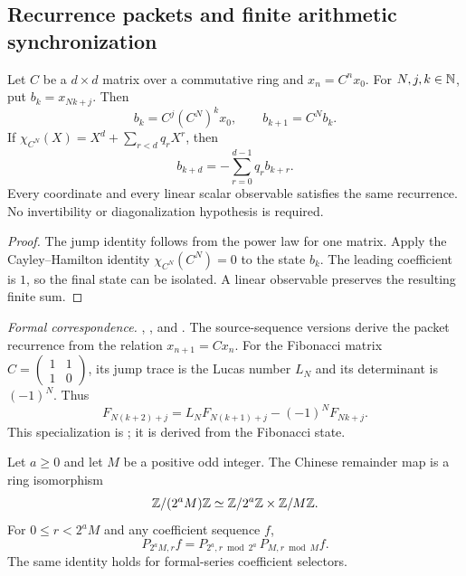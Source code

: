 \subsection{Recurrence packets and finite arithmetic synchronization}

\begin{theorem}
\label{thm:companion-foundation}
Let $C$ be a $d\times d$ matrix over a commutative ring and
$x_n=C^n x_0$. For $N,j,k\in\mathbb N$, put $b_k=x_{Nk+j}$. Then
\[
b_k=C^j(C^N)^kx_0,\qquad b_{k+1}=C^Nb_k.
\]
If $\chi_{C^N}(X)=X^d+\sum_{r<d}q_rX^r$, then
\[
b_{k+d}=-\sum_{r=0}^{d-1}q_r b_{k+r}.
\]
Every coordinate and every linear scalar observable satisfies the same
recurrence. No invertibility or diagonalization hypothesis is required.
\end{theorem}

\begin{proof}
The jump identity follows from the power law for one matrix. Apply the
Cayley--Hamilton identity $\chi_{C^N}(C^N)=0$ to the state $b_k$.
The leading coefficient is $1$, so the final state can be isolated. A linear
observable preserves the resulting finite sum.
\end{proof}

\begingroup\small\raggedright
\noindent\emph{Formal correspondence.}
,
, and
.
The source-sequence versions derive the packet recurrence from the relation
$x_{n+1}=Cx_n$.
For the Fibonacci matrix $C=\left(\begin{smallmatrix}1&1\\1&0\end{smallmatrix}\right)$,
its jump trace is the Lucas number $L_N$ and its determinant is $(-1)^N$.
Thus
\[
F_{N(k+2)+j}=L_NF_{N(k+1)+j}-(-1)^NF_{Nk+j}.
\]
This specialization is
; it is derived from the
Fibonacci state.
\par\endgroup

\begin{theorem}
\label{thm:crt-foundation}
Let $a\geq0$ and let $M$ be a positive odd integer. The Chinese remainder map
is a ring isomorphism
\[
\mathbb Z/(2^aM)\mathbb Z\simeq\mathbb Z/2^a\mathbb Z\times\mathbb Z/M\mathbb Z.
\]
For $0\leq r<2^aM$ and any coefficient sequence $f$,
\[
P_{2^aM,r}f
=P_{2^a,r\bmod 2^a}\,P_{M,r\bmod M}f.
\]
The same identity holds for formal-series coefficient selectors.
\end{theorem}

